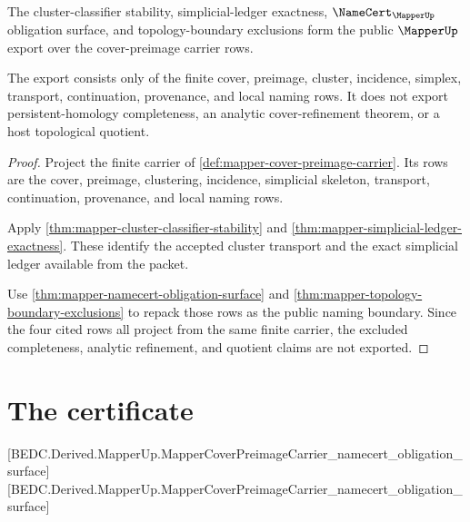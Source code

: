 \begin{theorem}
\label{thm:mapper-public-export}
The cluster-classifier stability, simplicial-ledger exactness,
$\NameCert_{\MapperUp}$ obligation surface, and topology-boundary exclusions
form the public $\MapperUp$ export over the cover-preimage carrier rows.

The export consists only of the finite cover, preimage, cluster, incidence,
simplex, transport, continuation, provenance, and local naming rows. It does
not export persistent-homology completeness, an analytic cover-refinement
theorem, or a host topological quotient.
\end{theorem}
\begin{proof}
Project the finite carrier of \autoref{def:mapper-cover-preimage-carrier}.
Its rows are the cover, preimage, clustering, incidence, simplicial skeleton,
transport, continuation, provenance, and local naming rows.

Apply \autoref{thm:mapper-cluster-classifier-stability} and
\autoref{thm:mapper-simplicial-ledger-exactness}. These identify the accepted
cluster transport and the exact simplicial ledger available from the packet.

Use \autoref{thm:mapper-namecert-obligation-surface} and
\autoref{thm:mapper-topology-boundary-exclusions} to repack those rows as the
public naming boundary. Since the four cited rows all project from the same
finite carrier, the excluded completeness, analytic refinement, and quotient
claims are not exported.
\end{proof}

\section{The certificate}
\label{sec:mapper-certificate}

[BEDC.Derived.MapperUp.MapperCoverPreimageCarrier\_namecert\_obligation\_surface]
[BEDC.Derived.MapperUp.MapperCoverPreimageCarrier\_namecert\_obligation\_surface]

